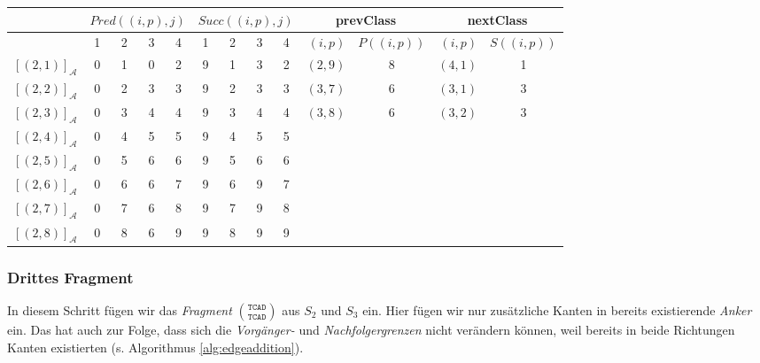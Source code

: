 \vspace{5pt}
\small
\begin{tabular}{r|cccc|cccc||r|c|r|c}
	& \multicolumn{4}{c|}{$Pred((i,p),j)$} & \multicolumn{4}{c||}{$Succ((i,p),j)$} & \multicolumn{2}{c|}{\textrm{prevClass}} & \multicolumn{2}{c}{\textrm{nextClass}} \\ \hline
	\diagbox[dir=NW]{$(i,p)$}{$j$} & 1 & 2 & 3 & 4 & 1 & 2 & 3 & 4 & $(i,p)$ & $P((i,p))$ & $(i,p)$ & $S((i,p))$ \\ \hline
	$[(2,1)]_{\mathcal{A}}$ & 0 & 1 & 0 & 2 & 9 & 1 & 3 & 2 & $(2,9)$ & 8 & $(4,1)$ & 1 \\
	$[(2,2)]_{\mathcal{A}}$ & 0 & 2 & 3 & 3 & 9 & 2 & 3 & 3 & $(3,7)$ & 6 & $(3,1)$ & 3 \\
	$[(2,3)]_{\mathcal{A}}$ & 0 & 3 & 4 & 4 & 9 & 3 & 4 & 4 & $(3,8)$ & 6 & $(3,2)$ & 3 \\
	$[(2,4)]_{\mathcal{A}}$ & 0 & 4 & 5 & 5 & 9 & 4 & 5 & 5 & & & & \\
	$[(2,5)]_{\mathcal{A}}$ & 0 & 5 & 6 & 6 & 9 & 5 & 6 & 6 & & & & \\
	$[(2,6)]_{\mathcal{A}}$ & 0 & 6 & 6 & 7 & 9 & 6 & 9 & 7 & & & & \\
	$[(2,7)]_{\mathcal{A}}$ & 0 & 7 & 6 & 8 & 9 & 7 & 9 & 8 & & & & \\
	$[(2,8)]_{\mathcal{A}}$ & 0 & 8 & 6 & 9 & 9 & 8 & 9 & 9 & & & &
\end{tabular}
\normalsize

\subsubsection{Drittes Fragment}

In diesem Schritt fügen wir das \emph{Fragment} ${\texttt{TCAD}}\choose{\texttt{TCAD}}$ aus $S_2$ und $S_3$ ein. Hier fügen wir nur zusätzliche Kanten in bereits existierende \emph{Anker} ein. Das hat auch zur Folge, dass sich die \emph{Vorgänger-} und \emph{Nachfolgergrenzen} nicht verändern können, weil bereits in beide Richtungen Kanten existierten (s. Algorithmus \ref{alg:edgeaddition}).

